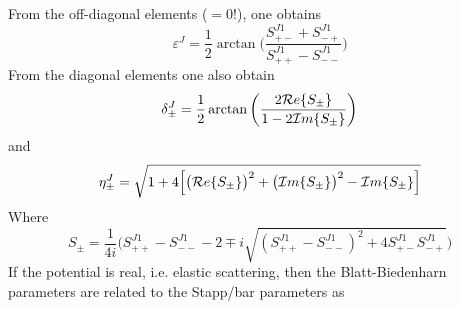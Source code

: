From the off-diagonal elements ($=0!$), one obtains
\begin{equation}\label{eq:Blatt-en1111}
\varepsilon^J=\frac{1}{2}\arctan\bigg(\frac{S^{J1}_{+-}+S^{J1}_{-+}}{S^{J1}_{++}-S^{J1}_{--}}\bigg) 
\end{equation}
From the diagonal elements one also obtain
\begin{equation}\label{eq:Blatt-en2222}
{\delta}^J_\pm=\frac{1}{2}\arctan\bigg(\frac{2{\cal R}e\{S_\pm\}}
{1-2{\cal I}m\{S_\pm\}}\bigg)
\end{equation}
and
\begin{equation}\label{eq:Blatt-en333} 
{\eta}^{J}_\pm=\sqrt{1+4\Big[\big({\cal R}e\{S_\pm\}\big)^2+\big({\cal I}m\{S_\pm\}\big)^2-{\cal I}m\{S_\pm\}\Big]}
\end{equation}
Where 
\begin{equation}\label{eq:Blatt-en1111222}
S_\pm=\frac{1}{4i}\bigg( S^{J1}_{++}-S^{J1}_{--}-2\mp i\sqrt{(S^{J1}_{++}-S^{J1}_{--})^2+4S^{J1}_{+-}S^{J1}_{-+}}\bigg)
\end{equation}
\nl
If the potential is real, i.e. elastic scattering, then the Blatt-Biedenharn parameters are related to the Stapp/bar parameters as

